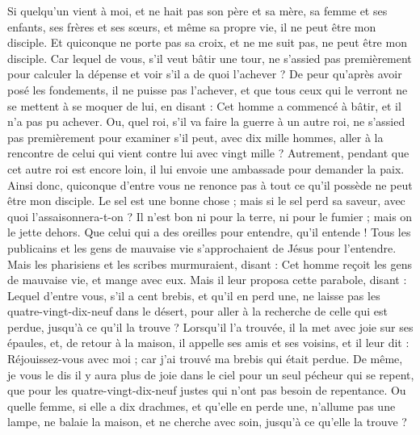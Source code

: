 \begin{multicols}{2}
Si quelqu'un vient à moi, et ne hait pas son père et sa mère, sa femme et ses enfants, ses frères et ses sœurs, et même sa propre vie, il ne peut être mon disciple.
Et quiconque ne porte pas sa croix, et ne me suit pas, ne peut être mon disciple.
Car lequel de vous, s’il veut bâtir une tour, ne s’assied pas premièrement pour calculer la dépense et voir s'il a de quoi l'achever ?
De peur qu'après avoir posé les fondements, il ne puisse pas l’achever, et que tous ceux qui le verront ne se mettent à se moquer de lui,
en disant : Cet homme a commencé à bâtir, et il n'a pas pu achever.
Ou, quel roi, s’il va faire la guerre à un autre roi, ne s’assied pas premièrement pour examiner s’il peut, avec dix mille hommes, aller à la rencontre de celui qui vient contre lui avec vingt mille ?
Autrement, pendant que cet autre roi est encore loin, il lui envoie une ambassade pour demander la paix.
Ainsi donc, quiconque d’entre vous ne renonce pas à tout ce qu'il possède ne peut être mon disciple.
Le sel est une bonne chose ; mais si le sel perd sa saveur, avec quoi l’assaisonnera-t-on ?
Il n'est bon ni pour la terre, ni pour le fumier ; mais on le jette dehors. Que celui qui a des oreilles pour entendre, qu'il entende !
\VerseOne{}Tous les publicains et les gens de mauvaise vie s'approchaient de Jésus pour l'entendre.
Mais les pharisiens et les scribes murmuraient, disant : Cet homme reçoit les gens de mauvaise vie, et mange avec eux.
Mais il leur proposa cette parabole, disant :
Lequel d'entre vous, s’il a cent brebis, et qu’il en perd une, ne laisse pas les quatre-vingt-dix-neuf dans le désert, pour aller à la recherche de celle qui est perdue, jusqu'à ce qu'il la trouve ?
Lorsqu’il l’a trouvée, il la met avec joie sur ses épaules,
et, de retour à la maison, il appelle ses amis et ses voisins, et il leur dit : Réjouissez-vous avec moi ; car j'ai trouvé ma brebis qui était perdue.
De même, je vous le dis il y aura plus de joie dans le ciel pour un seul pécheur qui se repent, que pour les quatre-vingt-dix-neuf justes qui n'ont pas besoin de repentance.
Ou quelle femme, si elle a dix drachmes, et qu’elle en perde une, n'allume pas une lampe, ne balaie la maison, et ne cherche avec soin, jusqu'à ce qu'elle la trouve ?

\end{multicols}
